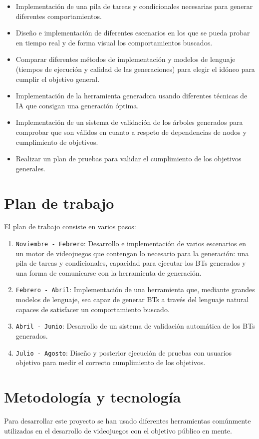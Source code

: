 \begin{itemize}
	\item Implementación de una pila de tareas y condicionales necesarias para generar diferentes comportamientos.
	\item Diseño e implementación de diferentes escenarios en los que se pueda probar en tiempo real y de forma visual los comportamientos buscados.
	\item Comparar diferentes métodos de implementación y modelos de lenguaje (tiempos de ejecución y calidad de las generaciones) para elegir el idóneo para cumplir el objetivo general.
	\item Implementación de la herramienta generadora usando diferentes técnicas de IA que consigan una generación óptima.
	\item Implementación de un sistema de validación de los árboles generados para comprobar que son válidos en cuanto a respeto de dependencias de nodos y cumplimiento de objetivos.
	\item Realizar un plan de pruebas para validar el cumplimiento de los objetivos generales.
\end{itemize}

\section{Plan de trabajo}
El plan de trabajo consiste en varios pasos:
\begin{enumerate}
	\item \texttt{Noviembre - Febrero}: Desarrollo e implementación de varios escenarios en un motor de videojuegos que contengan lo necesario para la generación: una pila de tareas y condicionales, capacidad para ejecutar los BTs generados y una forma de comunicarse con la herramienta de generación.
	\item \texttt{Febrero - Abril}: Implementación de una herramienta que, mediante grandes modelos de lenguaje, sea capaz de generar BTs a través del lenguaje natural capaces de satisfacer un comportamiento buscado.
	\item \texttt{Abril - Junio}: Desarrollo de un sistema de validación automática de los BTs generados.
	\item \texttt{Julio - Agosto}: Diseño y posterior ejecución de pruebas con usuarios objetivo para medir el correcto cumplimiento de los objetivos.
\end{enumerate}

\section{Metodología y tecnología}
Para desarrollar este proyecto se han usado diferentes herramientas comúnmente utilizadas en el desarrollo de videojuegos con el objetivo público en mente.

